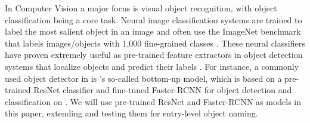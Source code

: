  


In Computer Vision a major focus is visual object recognition, with object classification being a core task. 
Neural image classification systems are trained to label the most salient object in an image and often use the ImageNet \cite{imagenet_cvpr09} benchmark that labels images/objects with 1,000 fine-grained classes \cite{googlenet,he2016deep}. 
These neural classifiers have proven extremely useful %
as pre-trained feature extractors in object detection systems that localize objects and predict their labels \cite{fasterrcnn2015}.
For instance, a commonly used object detector in \lv is \citet{anderson2018updown}'s so-called bottom-up model, which is based on a pre-trained ResNet classifier and fine-tuned Faster-RCNN \cite{fasterrcnn2015} for object detection and classification on \vg. 
We will use pre-trained ResNet and Faster-RCNN as models in this paper, extending and testing them for entry-level object naming. 

